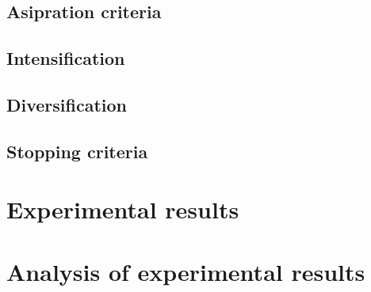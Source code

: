\documentclass{article} %
\begin{document}
\subsection{Asipration criteria}



\subsection{Intensification}



\subsection{Diversification}



\subsection{Stopping criteria}




\newpage
\section{Experimental results}
\label{exp_results}





\section{Analysis of experimental results}
\label{analysis_results}
\end{document}
